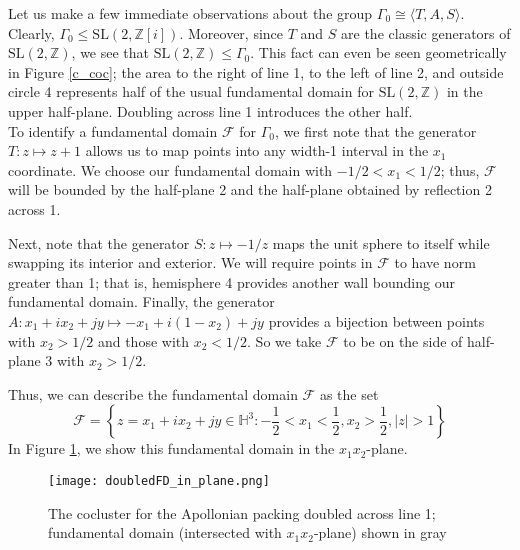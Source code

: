 \documentclass[]{article}
\begin{document}
Let us make a few immediate observations about the group $\Gamma_0 \cong \langle T, A, S \rangle$.
Clearly, $\Gamma_0 \leq \text{SL}(2, \mathbb{Z}[i])$.
Moreover, since $T$ and $S$ are the classic generators of $\text{SL}(2, \mathbb{Z})$, we see that $\text{SL}(2, \mathbb{Z}) \leq \Gamma_0$.
This fact can even be seen geometrically in Figure \ref{c_coc}; the area to the right of line 1, to the left of line 2, and outside circle 4 represents half of the usual fundamental domain for $\text{SL}(2, \mathbb{Z})$ in the upper half-plane.
Doubling across line 1 introduces the other half.
\\

To identify a fundamental domain $\mathcal{F}$ for $\Gamma_0$, we first note that the generator $T: z \mapsto z + 1$ allows us to map points into any width-1 interval in the $x_1$ coordinate.
We choose our fundamental domain with $-1/2 < x_1 < 1/2$; thus, $\mathcal{F}$ will be bounded by the half-plane 2 and the half-plane obtained by reflection 2 across 1.

Next, note that the generator $S : z \mapsto -1/z$ maps the unit sphere to itself while swapping its interior and exterior.
We will require points in $\mathcal{F}$ to have norm greater than 1; that is, hemisphere 4 provides another wall bounding our fundamental domain.
Finally, the generator $A: x_1 + ix_2 + jy \mapsto -x_1 + i(1 - x_2) + jy$ provides a bijection between points with $x_2 > 1/2$ and those with $x_2 < 1/2$.
So we take $\mathcal{F}$ to be on the side of half-plane 3 with $x_2 > 1/2$.

Thus, we can describe the fundamental domain $\mathcal{F}$ as the set
$$
\mathcal{F} = \left\{ z = x_1 + ix_2 + jy \in \mathbb{H}^3 : -\frac{1}{2} < x_1 < \frac{1}{2}, x_2 > \frac{1}{2}, |z| > 1 \right\}
$$
In Figure \ref{doubled_coc_2d}, we show this fundamental domain in the $x_1x_2$-plane.
\begin{figure}[h]
	\centering
	\texttt{[image: doubledFD\_in\_plane.png]}
	\caption{The cocluster for the Apollonian packing doubled across line 1; fundamental domain (intersected with $x_1x_2$-plane) shown in gray}
	\label{doubled_coc_2d}
\end{figure}
\\
\end{document}
